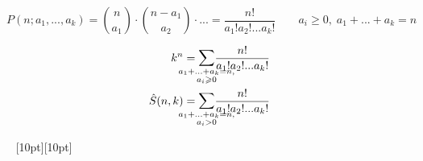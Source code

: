 \documentclass[a4paper,12pt]{article}
\numberwithin{figure}{section}
\theoremstyle{definition}
\theoremstyle{definition}
\begin{document}
\def\iinfracai{ \frac{n!}{a_1!a_2!...a_k!} }
\def\iisumain{ a_1+...+a_k=n }
\newcommand{\iisubsum}[1]{ {\mathlarger\sum_{\mathclap{\substack{#1}}}} }


\[ P(n;a_1,...,a_k) = \binom{n}{a_1} \cdot \binom{n-a_1}{a_2} \cdot ...
     = \iinfracai   \qquad a_i \geqslant 0, \; \iisumain \]

\begin{align*}
	k^n &= \iisubsum{\iisumain, \\ a_i \geqslant 0} \iinfracai \\
	\hat{S}(n,k) &= \iisubsum{ \iisumain, \\ a_i > 0} \iinfracai
\end{align*}




\vspace{80pt} \noindent \hrulefill~ \raisebox{-8pt}[10pt][10pt]{\Large{}}~ \hrulefill
\end{document}
